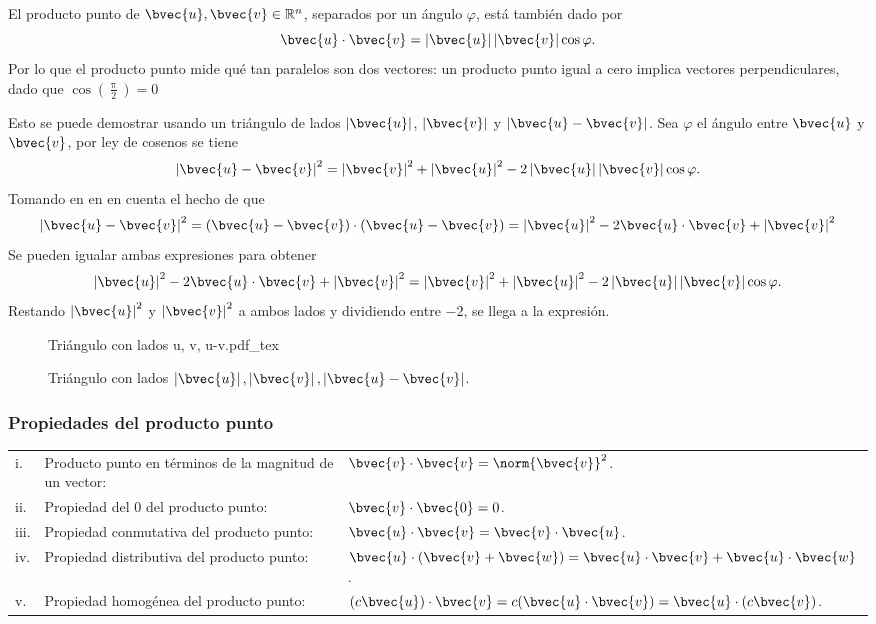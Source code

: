 \documentclass{fmbnotes}
\begin{document}
El producto punto de \( \bvec{u}, \bvec{v} \in \mathbb{R}^{n} \), separados por un ángulo \(\varphi\), está también dado por
\[\bvec{u} \cdot \bvec{v} = \left|\bvec{u}\right| \left|\bvec{v}\right| \cos \varphi.\]
Por lo que el producto punto mide qué tan paralelos son dos vectores: un producto punto igual a cero implica vectores perpendiculares, dado que \(\cos \left(\frac{\uppi}{2}\right)=0\)

Esto se puede demostrar usando un triángulo de lados \(\left|\bvec{u}\right|\), \(\left|\bvec{v}\right|\) y \(\left|\bvec{u}-\bvec{v}\right|\). Sea \(\varphi\) el ángulo entre \( \bvec{u} \) y \( \bvec{v} \), por ley de cosenos se tiene \[\left|\bvec{u}-\bvec{v}\right|^2=\left| \bvec{v} \right|^2+\left|\bvec{u}\right|^2-2\left|\bvec{u}\right|\left| \bvec{v} \right|\cos \varphi.\]
Tomando en en en cuenta el hecho de que 
\[\left|\bvec{u}-\bvec{v}\right|^2=(\bvec{u}-\bvec{v}) \cdot (\bvec{u}-\bvec{v}) = \left|\bvec{u}\right|^2-2\bvec{u} \cdot \bvec{v}+\left| \bvec{v} \right|^2\]
Se pueden igualar ambas expresiones para obtener
\[ \left|\bvec{u}\right|^2-2\bvec{u} \cdot \bvec{v}+\left| \bvec{v} \right|^2 = \left| \bvec{v} \right|^2+\left|\bvec{u}\right|^2-2\left|\bvec{u}\right|\left| \bvec{v} \right|\cos \varphi.\]
Restando \( \left|\bvec{u}\right|^2 \) y \( \left| \bvec{v} \right|^2 \) a ambos lados y dividiendo entre \( -2 \), se llega a la expresión.

\begin{figure}[H]
\centering
{Triángulo con lados u, v, u-v.pdf_tex}
\caption{Triángulo con lados \(\left| \bvec{u} \right|, \left| \bvec{v} \right|, \left|\bvec{u}-\bvec{v}\right|\).}
\label{fig:triangulo con lados u, v, u-v}
\end{figure}

\subsubsection{Propiedades del producto punto}

\begin{longtable}{lll}
	\rule[1ex]{0pt}{2.5ex}i.&Producto punto en términos de la magnitud de un vector: &\(\bvec{v} \cdot \bvec{v}=\norm{\bvec{v}}^{2}\). \\
	\rule[1ex]{0pt}{2.5ex}ii.&Propiedad del 0 del producto punto: &\(\bvec{v} \cdot \bvec{0}=0\). \\
	\rule[1ex]{0pt}{2.5ex}iii.&Propiedad conmutativa del producto punto: &\(\bvec{u} \cdot \bvec{v}=\bvec{v} \cdot \bvec{u}\). \\
	\rule[1ex]{0pt}{2.5ex}iv.&Propiedad distributiva del producto punto: &\( \bvec{u} \cdot(\bvec{v}+\bvec{w})=\bvec{u} \cdot \bvec{v}+\bvec{u} \cdot \bvec{w}\). \\
	\rule[1ex]{0pt}{2.5ex}v.&Propiedad homogénea del producto punto: &\( (c \bvec{u}) \cdot \bvec{v}=c(\bvec{u} \cdot \bvec{v})=\bvec{u} \cdot(c \bvec{v}) \). \\
\end{longtable}
\end{document}

